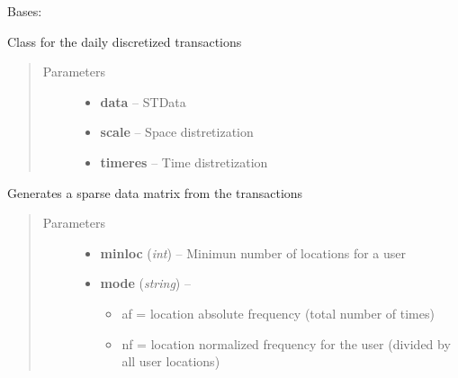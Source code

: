 \documentclass[letterpaper,10pt,english]{sphinxmanual}
\begin{document}
\begin{fulllineitems}
\label{index:SuperHub.Transactions.DailyDiscretizedTransactions}
Bases: {\hyperref[index:SuperHub.Transactions.DailyTransactions]{}}

Class for the daily discretized transactions
\begin{quote}\begin{description}
\item[{Parameters}] \leavevmode\begin{itemize}
\item {} 
\textbf{data} -- STData

\item {} 
\textbf{scale} -- Space distretization

\item {} 
\textbf{timeres} -- Time distretization

\end{itemize}

\end{description}\end{quote}

\begin{fulllineitems}
\label{index:SuperHub.Transactions.DailyDiscretizedTransactions.generate_data_matrix}
Generates a sparse data matrix from the transactions
\begin{quote}\begin{description}
\item[{Parameters}] \leavevmode\begin{itemize}
\item {} 
\textbf{minloc} (\emph{int}) -- Minimun number of locations for a user

\item {} 
\textbf{mode} (\emph{string}) -- \begin{itemize}
\item {} 
af = location absolute frequency (total number of times)

\item {} 
nf = location normalized frequency for the user (divided by all user locations)


\end{itemize}
\end{itemize}
\end{description}
\end{quote}
\end{fulllineitems}
\end{fulllineitems}
\end{document}
